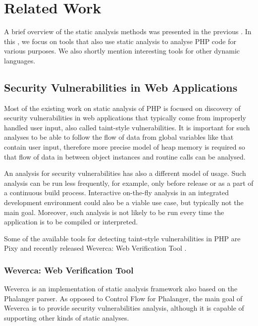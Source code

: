 \chapter{Related Work}
\label{relatedwork}

    A brief overview of the static analysis methods was presented 
    in the previous \wchapter{}. In this \wchapter{}, we focus on 
    tools that also use static analysis to analyse PHP code for 
    various purposes. We also shortly mention interesting tools 
    for other dynamic languages.

    \section{Security Vulnerabilities in Web Applications}
    
    Most of the existing work on static analysis of PHP is 
    focused on discovery of security vulnerabilities in 
    web applications that typically come from improperly 
    handled user input, also called taint-style vulnerabilities. 
    It is important for such analyses to be able to follow 
    the flow of data from global variables like  
    that contain user input, therefore more precise model of 
    heap memory is required so that flow of data in between 
    object instances and routine calls can be analysed. 
    
    An analysis for security vulnerabilities has also a different 
    model of usage. Such analysis can be run less frequently, 
    for example, only before release or as a part of a continuous 
    build process. Interactive on-the-fly analysis in an 
    integrated development environment could also be a viable 
    use case, but typically not the main goal. Moreover, 
    such analysis is not likely to be run every time the 
    application is to be compiled or interpreted.
    
    Some of the available tools for detecting taint-style 
    vulnerabilities in PHP are Pixy \cite{jovanovic2006pixy} 
    and recently released Weverca: Web Verification Tool \cite{hauzarhunting}.
    
    \subsection{Weverca: Web Verification Tool}
    
    Weverca is an implementation of static analysis framework also 
    based on the Phalanger parser. As opposed to Control Flow for 
    Phalanger, the main goal of Weverca is to provide security 
    vulnerabilities analysis, although it is capable of supporting 
    other kinds of static analyses.
    
